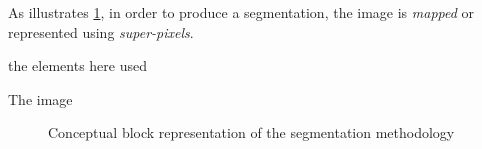 As illustrates \cref{fig:method}, in order to produce a segmentation, the image is \emph{mapped} or represented using \emph{super-pixels}. 

the elements here used 

 The image 
%
%
%
%
\begin{figure}[htpb]
  \centering
  \caption{Conceptual block representation of the segmentation methodology}
  \label{fig:method}
\end{figure}

